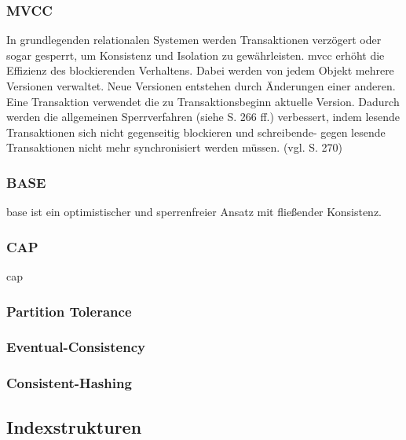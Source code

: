 \subsubsection{MVCC}
In grundlegenden relationalen Systemen werden Transaktionen verzögert oder sogar gesperrt, um Konsistenz und Isolation zu gewährleisten.
\Gls{mvcc} erhöht die Effizienz des  blockierenden Verhaltens.
Dabei werden von jedem Objekt mehrere Versionen verwaltet.
Neue Versionen entstehen durch Änderungen einer anderen.
Eine Transaktion verwendet die zu Transaktionsbeginn aktuelle Version.
Dadurch werden die allgemeinen Sperrverfahren (siehe \cite{book:kudrass} S. 266 ff.) verbessert, indem lesende Transaktionen sich nicht gegenseitig blockieren und schreibende- gegen lesende Transaktionen nicht mehr synchronisiert werden müssen. (vgl. \cite{book:kudrass} S. 270)

\subsubsection{BASE}
\Gls{base} ist ein optimistischer und sperrenfreier Ansatz mit fließender Konsistenz.
\cite{book:nosql-einfuehrung}

\subsubsection{CAP}
\Gls{cap}

\subsubsection{Partition Tolerance}

\subsubsection{Eventual-Consistency}

\subsubsection{Consistent-Hashing}



\subsection{Indexstrukturen}

